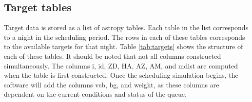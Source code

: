 \documentclass{article}
\begin{document}
\subsection{Target tables}

Target data is stored as a list of astropy tables.  Each table in the list corresponds to a night in the scheduling period.  The rows in each of these tables corresponds to the available targets for that night.  Table \ref{tab:targets} shows the structure of each of these tables.  It should be noted that not all columns constructed simultaneously.  The columns i, id, ZD, HA, AZ, AM, and mdist are computed when the table is first constructed.  Once the scheduling simulation begins, the software will add the columns vsb, bg, and weight, as these columns are dependent on the current conditions and status of the queue. 
\end{document}
